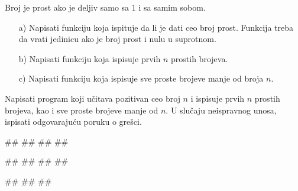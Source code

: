 \begin{Exercise}[label=FUN_08] 
Broj je prost ako je deljiv samo sa $1$ i sa samim sobom. 
\begin{itemize}
 \item [a)] Napisati funkciju  koja ispituje da li je dati ceo
  broj prost. Funkcija treba da vrati jedinicu ako je broj prost i nulu u suprotnom.
 \item [b)] Napisati funkciju  koja ispisuje prvih $n$ prostih brojeva.
 \item [c)] Napisati funkciju  koja ispisuje
sve proste brojeve manje od broja $n$.
\end{itemize}
Napisati program koji učitava pozitivan ceo broj $n$ i ispisuje prvih $n$ prostih brojeva, kao i sve proste brojeve manje od $n$.
U slučaju neispravnog unosa, ispisati odgovarajuću poruku o grešci.

\begin{miditest}
\begin{upotreba}{1}
#\naslovInt#
##
##
##
\end{upotreba}
\end{miditest}
\begin{miditest}
\begin{upotreba}{2}
#\naslovInt#
##
##
##
\end{upotreba}
\end{miditest}

\begin{miditest}
\begin{upotreba}{3}
#\naslovInt#
##
##
\end{upotreba}
\end{miditest}

\end{Exercise}
\ifresenja 
\begin{Answer}[ref=FUN_08]
\end{Answer} 
\fi



